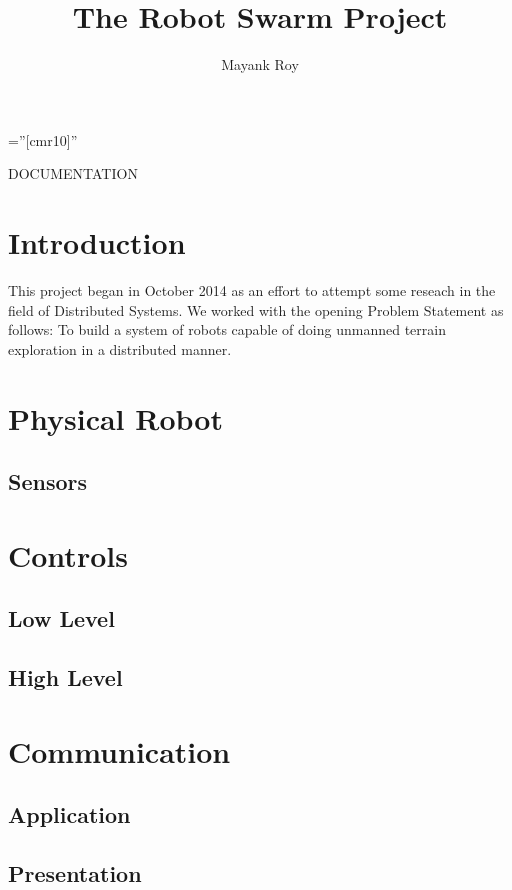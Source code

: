 \documentclass[a4paper,10pt]{article}
\theoremstyle{theorem}
\begin{document}
\pagestyle{empty} %
\font\fb=''[cmr10]'' %


\title{The Robot Swarm Project}
\maketitle
\begin{center}
\author{Mayank Roy}
\vskip 1in
\Large DOCUMENTATION
\vfill
\end{center}
\date
\clearpage

\section{Introduction}
This project began in October 2014 as an effort to attempt some reseach in the field of Distributed Systems. We worked with the opening Problem Statement as follows: To build a system of robots capable of doing unmanned terrain exploration in a distributed manner.

\section{Physical Robot}
\subsection{Sensors}

\section{Controls}
\subsection{Low Level}
\subsection{High Level}

\section{Communication}
\subsection{Application}
\subsection{Presentation}
\end{document}
